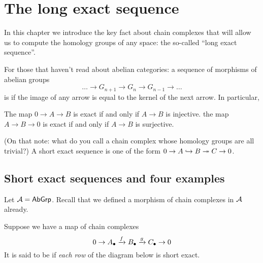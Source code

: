 \chapter{The long exact sequence}
\label{ch:long_exact_sequence}
In this chapter we introduce the key fact about chain complexes that will allow us to compute
the homology groups of any space: the so-called ``long exact sequence''.

For those that haven't read about abelian categories:
a sequence of morphisms of abelian groups
\[ \dots \to G_{n+1} \to G_n \to G_{n-1} \to \dots \]
is  if the image of any arrow is equal to the kernel of the next arrow.
In particular,
\begin{itemize}
	\ii The map $0 \to A \to B$ is exact if and only if $A \to B$ is injective.
	\ii the map $A \to B \to 0$ is exact if and only if $A \to B$ is surjective.
\end{itemize}
(On that note: what do you call a chain complex whose homology groups are all trivial?)
A short exact sequence is one of the form $0 \to A \injto B \surjto C \to 0$.

\section{Short exact sequences and four examples}
Let $\AA = \catname{AbGrp}$.
Recall that we defined a morphism of chain complexes in $\AA$ already.
\begin{definition}
Suppose we have a map of chain complexes
\[ 0 \to A_\bullet \taking f B_\bullet \taking g C_\bullet \to 0 \]
It is said to be  if \emph{each row} of the diagram below is short exact.
\begin{center}
\end{center}
\end{definition}

